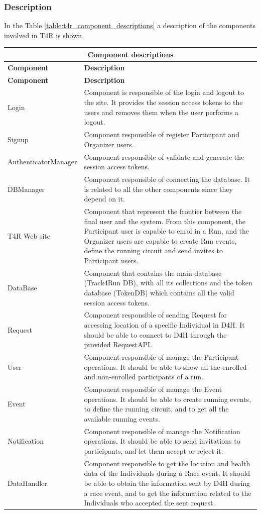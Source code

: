 \documentclass[a4paper, hidelinks, 12pt]{report}
\begin{document}
			\subsubsection{Description}
			In the Table \ref{table:t4r_component_descriptions} a description of the components involved in T4R is shown.
			
		\begin{longtable}{l p{}}
			\hline\hline
			\multicolumn{2}{c}{\textbf{Component descriptions}} \\
			\hline
			\textbf{Component} & \textbf{Description} \\ [0.5ex]
			\hline
			\endfirsthead
			\hline
			\textbf{Component} & \textbf{Description} \\ [0.5ex]
			\hline
			\endhead
			Login & Component is responsible of the login and logout to the site. It provides the session access tokens to the users and removes them when the user performs a logout. \\
			Signup & Component responsible of register Participant and Organizer users. \\
			AuthenticatorManager & Component responsible of validate and generate the session access tokens.\\
			DBManager & Component responsible of connecting the database. It is related to all the other components since they depend on it.\\
			T4R Web site & Component that represent the frontier between the final user and the system. From this component, the Participant user is capable to enrol in a Run, and the Organizer users are capable to create Run events, define the running circuit and send invites to Participant users.\\
			DataBase & Component that contains the main database (Track4Run DB), with all its collections and the token database (TokenDB) which contains all the valid session access tokens.\\
			Request & Component responsible of sending Request for accessing location of a specific Individual in D4H. It should be able to connect to D4H through the provided RequestAPI.\\
			User & Component responsible of manage the Participant operations. It should be able to show all the enrolled and non-enrolled participants of a run.\\
			Event & Component responsible of manage the Event operations. It should be able to create running events, to define the running circuit, and to get all the available running events.\\
			Notification & Component responsible of manage the Notification operations. It should be able to send invitations to participants, and let them accept or reject it. \\
			DataHandler & Component responsible to get the location and health data of the Individuals during a Race event. It should be able to obtain the information sent by D4H during a race event, and to get the information related to the Individuals who accepted the sent request.\\
			

\end{longtable}
\end{document}
